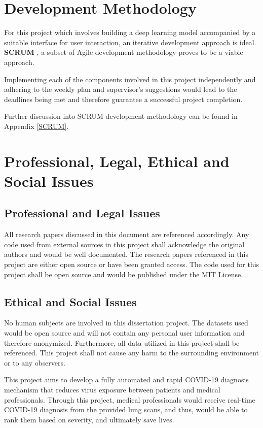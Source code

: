 \section{Development Methodology}

For this project which involves building a deep learning model 
accompanied by a suitable interface for user interaction, 
an iterative development approach is ideal. \textbf{SCRUM} \cite{SCR}, 
a subset of Agile development methodology proves to be a viable approach. 

Implementing each of the components involved in this project independently 
and adhering to the weekly plan and supervisor's suggestions 
would lead to the deadlines being met and therefore guarantee a successful project completion. 

Further discussion into SCRUM development methodology can be found in Appendix \ref{SCRUM}.

\section{Professional, Legal, Ethical and Social Issues}
\subsection{Professional and Legal Issues}
All research papers discussed in this document are referenced 
accordingly. Any code used from external sources in this project 
shall acknowledge the original authors and would be well documented.
The research papers referenced in this project are either open source 
or have been granted access. The code used for this project shall be 
open source and would be published under the MIT License.

\subsection{Ethical and Social Issues}
No human subjects are involved in this dissertation project. The 
datasets used would be open source and will not 
contain any personal user information and therefore anonymized. Furthermore, all data utilized in this 
project shall be referenced. This project shall not cause any harm to the 
surrounding environment or to any observers.

This project aims to develop a fully automated and rapid COVID-19 diagnosis 
mechanism that reduces virus exposure between patients and 
medical professionals. Through this project, medical professionals 
would receive real-time COVID-19 diagnosis from the provided lung scans, and thus, would be able to rank them based on severity, 
and ultimately save lives.

